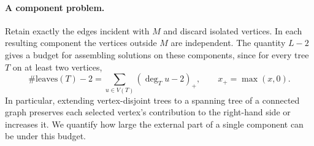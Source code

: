 \documentclass[11pt,a4paper]{article}
\numberwithin{equation}{section}
\begin{document}
\paragraph{A component problem.}
Retain exactly the edges incident with $M$ and discard isolated vertices.
In each resulting component the vertices outside $M$ are independent.
The quantity $L-2$ gives a budget for assembling solutions on these
components, since for every tree $T$ on at least two vertices,
\begin{equation}\label{wow165:budget}
 \#\mathrm{leaves}(T)-2=\sum_{u\in V(T)}(\deg_T u-2)_+,
 \qquad x_+=\max(x,0).
\end{equation}
In particular, extending vertex-disjoint trees to a spanning tree of a
connected graph preserves each selected vertex's contribution to the
right-hand side or increases it. We quantify how large the external
part of a single component can be under this budget.
\end{document}

